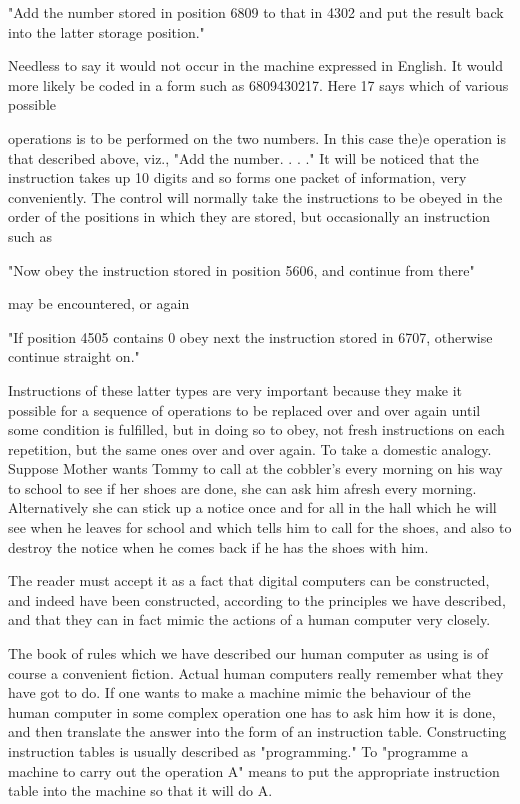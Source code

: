 \documentclass{article}
\begin{document}
"Add the number stored in position 6809 to that in 4302 and put the result back into the latter storage position."

Needless to say it would not occur in the machine expressed in English. It would more likely be coded in a form such as 6809430217. Here 17 says which of various possible

operations is to be performed on the two numbers. In this case the)e operation is that described above, viz., "Add the number. . . ." It will be noticed that the instruction takes up 10 digits and so forms one packet of information, very conveniently. The control will normally take the instructions to be obeyed in the order of the positions in which they are stored, but occasionally an instruction such as

"Now obey the instruction stored in position 5606, and continue from there"

may be encountered, or again

"If position 4505 contains 0 obey next the instruction stored in 6707, otherwise continue straight on."

Instructions of these latter types are very important because they make it possible for a sequence of operations to be replaced over and over again until some condition is fulfilled, but in doing so to obey, not fresh instructions on each repetition, but the same ones over and over again. To take a domestic analogy. Suppose Mother wants Tommy to call at the cobbler's every morning on his way to school to see if her shoes are done, she can ask him afresh every morning. Alternatively she can stick up a notice once and for all in the hall which he will see when he leaves for school and which tells him to call for the shoes, and also to destroy the notice when he comes back if he has the shoes with him.

The reader must accept it as a fact that digital computers can be constructed, and indeed have been constructed, according to the principles we have described, and that they can in fact mimic the actions of a human computer very closely.

The book of rules which we have described our human computer as using is of course a convenient fiction. Actual human computers really remember what they have got to do. If one wants to make a machine mimic the behaviour of the human computer in some complex operation one has to ask him how it is done, and then translate the answer into the form of an instruction table. Constructing instruction tables is usually described as "programming." To "programme a machine to carry out the operation A" means to put the appropriate instruction table into the machine so that it will do A.
\end{document}
